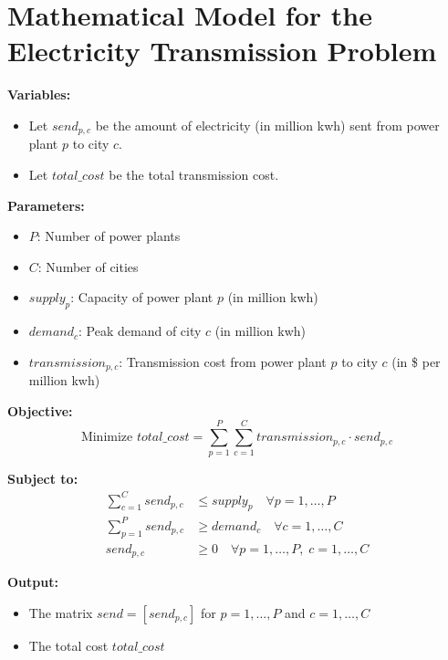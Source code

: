 \documentclass{article}
\begin{document}
\section*{Mathematical Model for the Electricity Transmission Problem}

\textbf{Variables:}
\begin{itemize}
    \item Let \( send_{p,c} \) be the amount of electricity (in million kwh) sent from power plant \( p \) to city \( c \).
    \item Let \( total\_cost \) be the total transmission cost.
\end{itemize}

\textbf{Parameters:}
\begin{itemize}
    \item \( P \): Number of power plants
    \item \( C \): Number of cities
    \item \( supply_{p} \): Capacity of power plant \( p \) (in million kwh)
    \item \( demand_{c} \): Peak demand of city \( c \) (in million kwh)
    \item \( transmission_{p,c} \): Transmission cost from power plant \( p \) to city \( c \) (in \$ per million kwh)
\end{itemize}

\textbf{Objective:}
\[
\text{Minimize } total\_cost = \sum_{p=1}^{P} \sum_{c=1}^{C} transmission_{p,c} \cdot send_{p,c}
\]

\textbf{Subject to:}
\begin{align}
    \sum_{c=1}^{C} send_{p,c} & \leq supply_{p} \quad \forall p = 1, \ldots, P \tag{1} \\
    \sum_{p=1}^{P} send_{p,c} & \geq demand_{c} \quad \forall c = 1, \ldots, C \tag{2} \\
    send_{p,c} & \geq 0 \quad \forall p = 1, \ldots, P, \; c = 1, \ldots, C \tag{3}
\end{align}

\textbf{Output:}
\begin{itemize}
    \item The matrix \( send = [send_{p,c}] \) for \( p = 1, \ldots, P \) and \( c = 1, \ldots, C \)
    \item The total cost \( total\_cost \)
\end{itemize}
\end{document}
